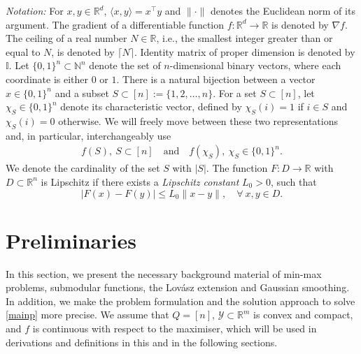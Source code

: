 \documentclass{article}
\theoremstyle{plain}
\theoremstyle{definition}
\theoremstyle{remark}
\newcommand{\R}{\mathbb{R}}
\newcommand{\N}{\mathbb{N}}
\begin{document}
\noindent\emph{Notation:}
For $x,y\in \mathbb{R}^d$,  $\langle x , y \rangle=x^\top y$ and %
$\|\cdot\|$ denotes %
the Euclidean norm of its argument. The gradient of a differentiable function $f: \mathbb{R}^{d} %
\to \mathbb{R}$ is denoted by  $\nabla f$. The ceiling of a real number \(N\in\R\), i.e., the smallest integer greater than or equal to \(N\), is denoted by \(\lceil N \rceil\).
 Identity matrix of proper dimension is denoted by $\mathbb{I}.$ Let $\{0,1\}^n \subset \N^n$
denote the set of $n$-dimensional binary vectors, where each coordinate is either $0$ or $1$.  There is a natural bijection between a vector $x \in \{0,1\}^n$ and a subset $S \subset [n]:=\{1,2,\ldots,n\}$. For a set $S \subset [n]$, let $\chi_S \in \{0,1\}^n$ denote its characteristic vector, 
defined by $\chi_S(i) = 1$ if $i \in S$ and $\chi_S(i) = 0$ otherwise.
 We will freely move between these two representations and, in particular, interchangeably use
\begin{align}
    f(S), \ S \subset [n] \quad \text{and} \quad f(\chi_S), \ \chi_S \in  \{0,1\}^n.
\end{align}
We denote the cardinality of the set $S$ with $|S|.$
The function $F:D\rightarrow \mathbb{R}$ with $D\subset \mathbb{R}^n$ is Lipschitz if there exists a \emph{Lipschitz constant} $L_0>0$, such that
	\begin{equation}\label{def:lip}
		|F(x)-F(y)|\leq L_0\|x-y\|,\quad \forall \ x,y\in D. %
	\end{equation}


\section{Preliminaries}\label{sec:prem}

In this section, we present the necessary
background material of min-max problems, submodular functions, the Lovász extension and Gaussian smoothing. 
In addition, we make the problem formulation and the solution approach to solve \eqref{mainp} %
more precise.
We assume that $Q=[n]$, $\mathcal{Y}\subset \R^m$ is convex and compact, and $f$ is continuous with respect to the maximiser, which will be used in derivations and definitions in this and in the following sections.  
\end{document}
